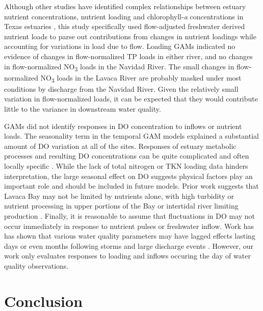 \documentclass[sn-basic,referee,lineno,pdflatex]{sn-jnl}
\begin{document}
Although other studies have identified complex relationships between
estuary nutrient concentrations, nutrient loading and
chlorophyll-\emph{a} concentrations in Texas estuaries
\citep{ornolfsdottirNutrientPulsingRegulator2004, doradoUnderstandingInteractionsFreshwater2015, ciraPhytoplanktonDynamicsLowinflow2021, tominackVariabilityPhytoplanktonBiomass2022},
this study specifically used flow-adjusted freshwater derived nutrient
loads to parse out contributions from changes in nutrient loadings while
accounting for variations in load due to flow. Loading GAMs indicated no
evidence of changes in flow-normalized TP loads in either river, and no
changes in flow-normalized NO\textsubscript{3} loads in the Navidad
River. The small changes in flow-normalized NO\textsubscript{3} loads in
the Lavaca River are probably masked under most conditions by discharge
from the Navidad River. Given the relatively small variation in
flow-normalized loads, it can be expected that they would contribute
little to the variance in downstream water quality.

GAMs did not identify responses in DO concentration to inflows or
nutrient loads. The seasonality term in the temporal GAM models
explained a substantial amount of DO variation at all of the sites.
Responses of estuary metabolic processes and resulting DO concentrations
can be quite complicated and often locally specific
\citep{caffreyFactorsControllingNet2004}. While the lack of total
nitrogen or TKN loading data hinders interpretation, the large seasonal
effect on DO suggests physical factors play an important role and should
be included in future models. Prior work suggests that Lavaca Bay may
not be limited by nutrients alone, with high turbidity or nutrient
processing in upper portions of the Bay or intertidal river limiting
production \citep{russell_effect_2006}. Finally, it is reasonable to
assume that fluctuations in DO may not occur immediately in response to
nutrient pulses or freshwater inflow. Work has has shown that various
water quality parameters may have lagged effects lasting days or even
months following storms and large discharge events
\citep{mooneyWatershedExportEvents2012a, wetzExtremeFutureEstuaries2013, bukaveckasInfluenceStormEvents2020, walkerTimescalesMagnitudeWater2021}.
However, our work only evaluates responses to loading and inflows
occuring the day of water quality observations.

\hypertarget{conclusion}{%
\section{Conclusion}\label{conclusion}}
\end{document}
